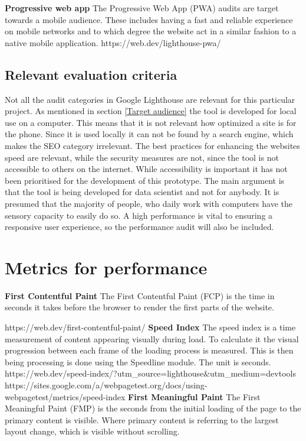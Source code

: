 \textbf{Progressive web app}
The Progressive Web App (PWA) audits are target towards a mobile audience. These includes having a fast and reliable experience on mobile networks and to which degree the website act in a similar fashion to a native mobile application.
https://web.dev/lighthouse-pwa/

\subsection{Relevant evaluation criteria}
 
Not all the audit categories in Google Lighthouse are relevant for this particular project. As mentioned in section \ref{Target audience}  the tool is developed for local use on a computer. This means that it is not relevant how optimized a site is for the phone. Since it is used locally it can not be found by a search engine, which makes the SEO category irrelevant. The best practices for enhancing the websites speed are relevant, while the security measures are not, since the tool is not accessible to others on the internet. While accessibility is important it has not been prioritised for the development of this prototype. The main argument is that the tool is being developed for data scientist and not for anybody. It is presumed that the majority of people, who daily work with computers have the sensory capacity to easily do so. A high performance is vital to ensuring a responsive user experience, so the performance audit will also be included.



\section{Metrics for performance}






\textbf{First Contentful Paint}
The First Contentful Paint (FCP) is the time in seconds it takes before the browser to render the first parts of the website. 

https://web.dev/first-contentful-paint/
\textbf{Speed Index}
The speed index is a time measurement of content appearing visually during load. To calculate it the visual progression between each frame of the loading process is measured. This is then being processing is done using the Speedline module. The unit is seconds.
https://web.dev/speed-index/?utm_source=lighthouse&utm_medium=devtools
https://sites.google.com/a/webpagetest.org/docs/using-webpagetest/metrics/speed-index
\textbf{First Meaningful Paint}
The First Meaningful Paint (FMP) is the seconds from the initial loading of the page to the primary content is visible. Where primary content is referring to the largest layout change, which is visible without scrolling.

